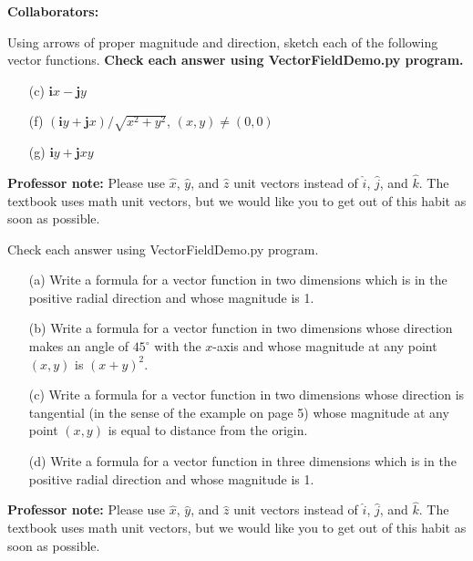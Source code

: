 \documentclass[11pt,letterpaper,boxed]{hmcpset}
\begin{document}
	
	\noindent\textbf{Collaborators:} 
	
	
	\begin{problem}[Schey I-1 (c,f,g)]
		Using arrows of proper magnitude and direction, sketch each of the following vector functions. \textbf{Check each answer using VectorFieldDemo.py program.}
		\begin{enumerate}
			\item[(c)] $\textbf{i}x - \textbf{j}y$
			\item[(f)] $(\textbf{i}y + \textbf{j}x)/\sqrt{x^2+y^2}$, $(x,y) \neq (0,0)$
			\item[(g)] $\textbf{i}y + \textbf{j}xy$
		\end{enumerate}
	
		\textbf{Professor note:} Please use $\hat x$, $\hat y$, and $\hat z$ unit vectors instead of $\hat i$, $\hat j$, and $\hat k$. The textbook uses math unit vectors, but we would like you to get out of this habit as soon as possible. 
		
	\end{problem}
	
	\begin{solution}
		\vfill
	\end{solution}
	\newpage
	
	
	\begin{problem}[Schey I-3]
		Check each answer using VectorFieldDemo.py program.
		\begin{enumerate}
			\item[(a)] Write a formula for a vector function in two dimensions which is in the positive radial direction and whose magnitude is 1.
			\item[(b)] Write a formula for a vector function in two dimensions whose direction makes an angle of $45^{\circ}$ with the $x$-axis and whose magnitude at any point $(x,y)$ is $(x+y)^2$.
			\item[(c)] Write a formula for a vector function in two dimensions whose direction is tangential (in the sense of the example on page 5) whose magnitude at any point $(x,y)$ is equal to distance from the origin.
			\item[(d)] Write a formula for a vector function in three dimensions which is in the positive radial direction and whose magnitude is 1.
		\end{enumerate}
		
		\textbf{Professor note:} Please use $\hat x$, $\hat y$, and $\hat z$ unit vectors instead of $\hat i$, $\hat j$, and $\hat k$. The textbook uses math unit vectors, but we would like you to get out of this habit as soon as possible. 
		
	\end{problem}
	
\end{document}
